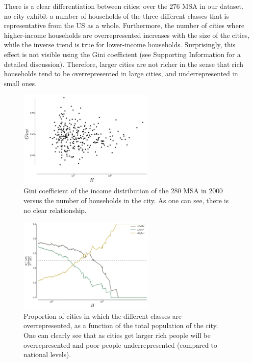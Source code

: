 There is a clear differentiation between cities: over the $276$ MSA in our
dataset, no city exhibit a number of households of the three different classes
that is representative from the US as a whole. Furthermore, the number of cities
where higher-income households are overrepresented increases with the size of
the cities, while the inverse trend is true for lower-income households.
Surprisingly, this effect is not visible using the Gini coefficient (see
Supporting Information for a detailed discussion).  Therefore, larger cities are not richer in the
sense that rich households tend to be overrepresented in large cities, and
underrepresented in small ones.


\begin{figure}[!h]
    \centering
    \includegraphics[width=0.6\textwidth]{./gfx/chapter-segregation/gini_income.pdf}
    \caption{Gini coefficient of the income distribution of the $280$ MSA in
    $2000$ versus the number of households in the city. As one can see, there is
no clear relationship.\label{fig:gini}}
\end{figure}

\begin{figure}
    \centering
    \includegraphics[width=0.6\textwidth]{gfx/chapter-segregation/figure3.pdf}
    \caption{Proportion of cities in which the different classes are
    overrepresented, as a function of the total population of the city. One can
    clearly see that as cities get larger rich people will
    be overrepresented and poor people underrepresented (compared to national
    levels). \label{fig:inter-urban_representation}}
\end{figure}


